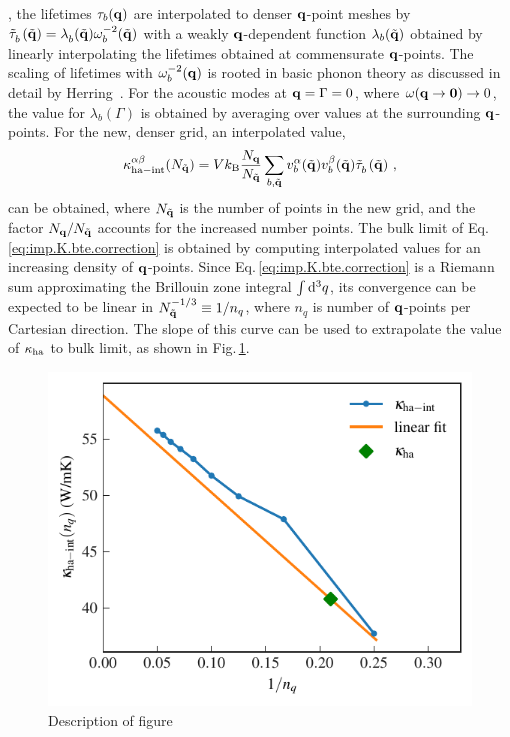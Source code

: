 , the lifetimes $\tau_b ({\bf q})$ are interpolated to denser $\bf q$-point meshes by $\fD{\tilde{\tau}}_b (\tilde{\bf q}) = \fD \lambda_b (\tilde {\bf q}) \omega_b^{-2} (\tilde {\bf q})$ with a weakly $\bf q$-dependent function $\lambda_b (\tilde {\bf q})$ obtained by linearly interpolating the lifetimes obtained at commensurate $\bf q$-points. The scaling of lifetimes with $\omega_b^{-2} ({\bf q})$ is rooted in basic phonon theory as discussed in detail by Herring~\cite{Herring1954}. For the acoustic modes at ${\bf q} = \Gamma = 0$, where $\omega ({\bf q \to 0}) \to 0$, the value for $\lambda_b (\Gamma)$ is obtained by averaging over values at the surrounding $\bf q$-points. For the new, denser grid, an interpolated value,
\begin{align}
	\kappa_{\rm ha - int}^{\alpha \beta} (N_{\tilde{\bf q}}) = V k_{\rm B} \frac{N_{\bf q}}{N_{\tilde{\bf q}}} \sum_{b, \tilde{\bf q}} v^\alpha_b (\tilde{\bf q}) v^{\beta}_b (\tilde{\bf q}) \fD{\tilde{\tau}}_b (\tilde{\bf q})~,
	\label{eq:imp.K.bte.correction}
\end{align}
can be obtained, where $N_{\tilde{\bf q}}$ is the number of points in the new grid, and the factor $N_{\bf q} / N_{\tilde{\bf q}}$ accounts for the increased number points. The bulk limit of Eq.\,\eqref{eq:imp.K.bte.correction} is obtained by computing interpolated values for an increasing density of $\bf q$-points. Since Eq.\,\eqref{eq:imp.K.bte.correction} is a Riemann sum approximating the Brillouin zone integral $\int {\rm d}^3 q$, its convergence can be expected to be linear in $N_{\tilde{\bf q}}^{-1/3} \equiv 1 / n_q$, where $n_q$ is number of $\bf q$-points per Cartesian direction. The slope of this curve can be used to extrapolate the value of $\kappa_{\rm ha}$ to bulk limit, as shown in Fig.\,\ref{fig:imp.kappa.bte.correction}.
\begin{figure}
	\includegraphics[width=.8\textwidth]{./data/plots/lifetimes/greenkubo_summary_interpolation_fit.pdf}
	\caption{Description of figure}
	\label{fig:imp.kappa.bte.correction}
\end{figure}
